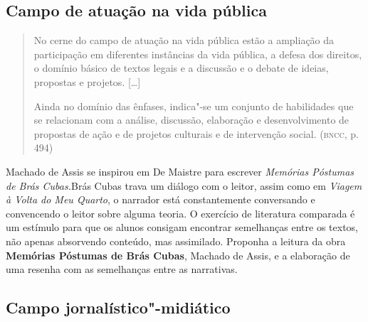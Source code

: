\documentclass[12pt]{extarticle}
\begin{document}
\subsection{Campo de atuação na vida pública}

\begin{quote}
No cerne do campo de atuação na vida pública estão a ampliação da
participação em diferentes instâncias da vida pública, a defesa dos
direitos, o domínio básico de textos legais e a discussão e o debate de
ideias, propostas e projetos. {[}\ldots{}{]}

Ainda no domínio das ênfases, indica"-se um conjunto de habilidades que
se relacionam com a análise, discussão, elaboração e desenvolvimento de
propostas de ação e de projetos culturais e de intervenção social.
(\textsc{bncc}, p. 494)
\end{quote}

Machado de Assis se inspirou em De Maistre para escrever
\emph{Memórias Póstumas de Brás Cubas.}Brás Cubas trava um diálogo com
o leitor, assim como em \emph{Viagem à Volta do Meu Quarto}, o
narrador está constantemente conversando e convencendo o leitor sobre
alguma teoria. O exercício de literatura comparada é um estímulo para
que os alunos consigam encontrar semelhanças entre os textos, não
apenas absorvendo conteúdo, mas assimilado. Proponha a leitura da obra
\textbf{Memórias Póstumas de Brás Cubas}, Machado de Assis, e a
elaboração de uma resenha com as semelhanças entre as narrativas.

\subsection{Campo jornalístico"-midiático}
\end{document}
